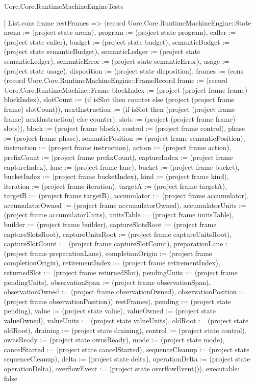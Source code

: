 \begin{lexlean}{Uorc.Core.RuntimeMachineEngineTests}
\begin{semanticmodule}
{    | List.cons frame restFrames => (record Uorc.Core.RuntimeMachineEngine::State {arena := (project state arena), program := (project state program), caller := (project state caller), budget := (project state budget), semanticBudget := (project state semanticBudget), semanticLedger := (project state semanticLedger), semanticError := (project state semanticError), usage := (project state usage), disposition := (project state disposition), frames := (cons (record Uorc.Core.RuntimeMachineEngine::FrameRecord {frame := (record Uorc.Core.RuntimeMachine::Frame {blockIndex := (project (project frame frame) blockIndex), slotCount := (if isSlot then counter else (project (project frame frame) slotCount)), nextInstruction := (if isSlot then (project (project frame frame) nextInstruction) else counter), slots := (project (project frame frame) slots)}), block := (project frame block), control := (project frame control), phase := (project frame phase), semanticPosition := (project frame semanticPosition), instruction := (project frame instruction), action := (project frame action), prefixCount := (project frame prefixCount), captureIndex := (project frame captureIndex), lane := (project frame lane), bucket := (project frame bucket), bucketIndex := (project frame bucketIndex), kind := (project frame kind), iteration := (project frame iteration), targetA := (project frame targetA), targetB := (project frame targetB), accumulator := (project frame accumulator), accumulatorOwned := (project frame accumulatorOwned), accumulatorUnits := (project frame accumulatorUnits), unitsTable := (project frame unitsTable), builder := (project frame builder), captureSlotsRoot := (project frame captureSlotsRoot), captureUnitsRoot := (project frame captureUnitsRoot), captureSlotCount := (project frame captureSlotCount), preparationLane := (project frame preparationLane), completionOrigin := (project frame completionOrigin), retirementIndex := (project frame retirementIndex), returnedSlot := (project frame returnedSlot), pendingUnits := (project frame pendingUnits), observationSpan := (project frame observationSpan), observationOwned := (project frame observationOwned), observationPosition := (project frame observationPosition)}) restFrames), pending := (project state pending), value := (project state value), valueOwned := (project state valueOwned), valueUnits := (project state valueUnits), oldRoot := (project state oldRoot), draining := (project state draining), control := (project state control), ownsReady := (project state ownsReady), mode := (project state mode), cancelStarted := (project state cancelStarted), sequenceCleanup := (project state sequenceCleanup), delta := (project state delta), operationDelta := (project state operationDelta), overflowEvent := (project state overflowEvent)})),
  executable: false
}


\end{semanticmodule}
\end{lexlean}
